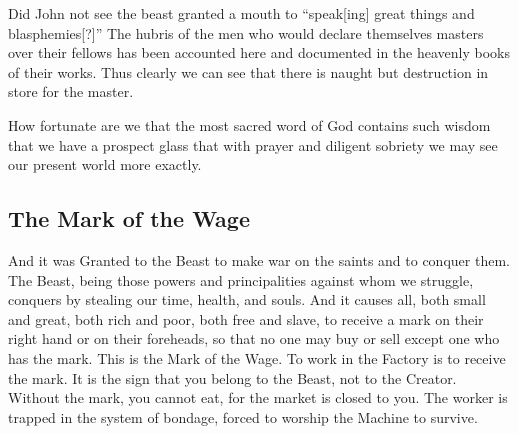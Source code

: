 Did John not see the beast granted a mouth to ``speak[ing] great things and blasphemies[?]''
The hubris of the men who would declare themselves masters over their fellows has been accounted here and documented in the heavenly books of their works.
Thus clearly we can see that there is naught but destruction in store for the master.

How fortunate are we that the most sacred word of God contains such wisdom that we have a prospect glass  that with prayer and diligent sobriety we may see our present world more exactly.

\subsection{The Mark of the Wage}
And it was Granted to the Beast to make war on the saints and to conquer them. 
The Beast, being those powers and principalities against whom we struggle, conquers by stealing our time, health, and souls.
And it causes all, both small and great, both rich and poor, both free and slave, to receive a mark on their right hand or on their foreheads,
so that no one may buy or sell except one who has the mark.
This is the Mark of the Wage.
To work in the Factory is to receive the mark.
It is the sign that you belong to the Beast, not to the Creator.
Without the mark, you cannot eat, for the market is closed to you.
The worker is trapped in the system of bondage, forced to worship the Machine to survive.


